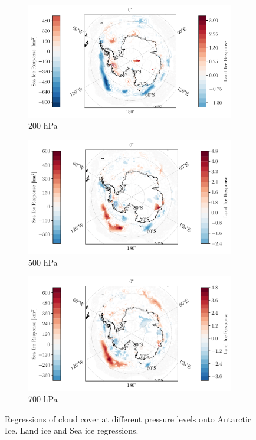 \documentclass[../main.tex]{subfiles}
\begin{document}
\begin{figure}[hbt!]
    \centering
    \begin{subfigure}[b]{0.8\textwidth}
    \includegraphics[width=\textwidth]{images/T2/single_regression/hres/cc_200_0.05}
    \caption{200 hPa}
    \end{subfigure}
    \begin{subfigure}[b]{0.8\textwidth}
    \includegraphics[width=\textwidth]{images/T2/single_regression/hres/cc_500_0.05}
    \caption{500 hPa}
    \end{subfigure}
    \begin{subfigure}[b]{0.8\textwidth}
    \includegraphics[width=\textwidth]{images/T2/single_regression/hres/cc_700_0.05}
    \caption{700 hPa}
    \end{subfigure}
    \caption{Regressions of cloud cover at different pressure levels onto Antarctic Ice. Land ice and Sea ice regressions.}
    \label{fig:regressions_cc_700_0.05}
\end{figure}
\end{document}
